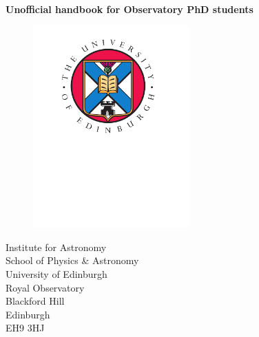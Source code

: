 
\hspace{1.0in}
\vspace{0.5in}

\begin{center}

  \huge {\bf Unofficial handbook for Observatory PhD students}

  \vspace{1.5in}

  \begin{figure}
  \begin{center}
  \includegraphics[width=60mm]{crest.pdf}
  \end{center}
  \end{figure}


  \normalsize

        Institute for Astronomy  \\
        School of Physics \& Astronomy \\
        University of Edinburgh \\
        Royal Observatory \\
        Blackford Hill \\
        Edinburgh \\
        EH9 3HJ

\end{center}
